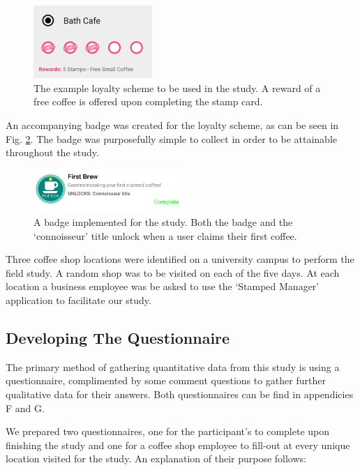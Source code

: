 \begin{figure}[H]
 \centering
  \includegraphics[width=0.40\textwidth]{img/bathcafe.png}
     \caption{The example loyalty scheme to be used in the study. A reward of a free coffee is offered upon completing the stamp card.}
     \label{fig:bathcafe2}
\end{figure}

An accompanying badge was created for the loyalty scheme, as can be seen in Fig. \ref{fig:badge2}. The badge was purposefully simple to collect in order to be attainable throughout the study.

\begin{figure}[H]
 \centering
  \includegraphics[width=0.50\textwidth]{img/badge2.png}
     \caption{A badge implemented for the study. Both the badge and the `connoisseur' title unlock when a user claims their first coffee.}
     \label{fig:badge2}
\end{figure}

Three coffee shop locations were identified on a university campus to perform the field study. A random shop was to be visited on each of the five days. At each location a business employee was be asked to use the `Stamped Manager' application to facilitate our study.

\subsection{Developing The Questionnaire}
The primary method of gathering quantitative data from this study is using a questionnaire, complimented by some comment questions to gather further qualitative data for their answers. Both questionnaires can be find in appendicies F and G.

We prepared two questionnaires, one for the participant's to complete upon finishing the study and one for a coffee shop employee to fill-out at every unique location visited for the study. An explanation of their purpose follows:

